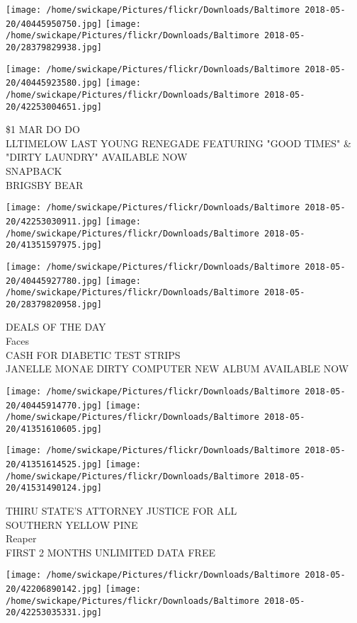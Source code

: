 \documentclass[10pt,letterpaper]{article}
\begin{document}
\texttt{[image: /home/swickape/Pictures/flickr/Downloads/Baltimore 2018-05-20/40445950750.jpg]}
\texttt{[image: /home/swickape/Pictures/flickr/Downloads/Baltimore 2018-05-20/28379829938.jpg]}

\texttt{[image: /home/swickape/Pictures/flickr/Downloads/Baltimore 2018-05-20/40445923580.jpg]}
\texttt{[image: /home/swickape/Pictures/flickr/Downloads/Baltimore 2018-05-20/42253004651.jpg]}

\$1 MAR DO DO\\
LLTIMELOW LAST YOUNG RENEGADE FEATURING "GOOD TIMES" \& "DIRTY LAUNDRY" AVAILABLE NOW\\
SNAPBACK\\
BRIGSBY BEAR
\pagebreak

\texttt{[image: /home/swickape/Pictures/flickr/Downloads/Baltimore 2018-05-20/42253030911.jpg]}
\texttt{[image: /home/swickape/Pictures/flickr/Downloads/Baltimore 2018-05-20/41351597975.jpg]}

\texttt{[image: /home/swickape/Pictures/flickr/Downloads/Baltimore 2018-05-20/40445927780.jpg]}
\texttt{[image: /home/swickape/Pictures/flickr/Downloads/Baltimore 2018-05-20/28379820958.jpg]}

DEALS OF THE DAY\\
Faces\\
CASH FOR DIABETIC TEST STRIPS\\
JANELLE MONAE DIRTY COMPUTER NEW ALBUM AVAILABLE NOW
\pagebreak

\texttt{[image: /home/swickape/Pictures/flickr/Downloads/Baltimore 2018-05-20/40445914770.jpg]}
\texttt{[image: /home/swickape/Pictures/flickr/Downloads/Baltimore 2018-05-20/41351610605.jpg]}

\texttt{[image: /home/swickape/Pictures/flickr/Downloads/Baltimore 2018-05-20/41351614525.jpg]}
\texttt{[image: /home/swickape/Pictures/flickr/Downloads/Baltimore 2018-05-20/41531490124.jpg]}

THIRU STATE'S ATTORNEY JUSTICE FOR ALL\\
SOUTHERN YELLOW PINE\\
Reaper\\
FIRST 2 MONTHS UNLIMITED DATA FREE
\pagebreak

\texttt{[image: /home/swickape/Pictures/flickr/Downloads/Baltimore 2018-05-20/42206890142.jpg]}
\texttt{[image: /home/swickape/Pictures/flickr/Downloads/Baltimore 2018-05-20/42253035331.jpg]}
\end{document}
